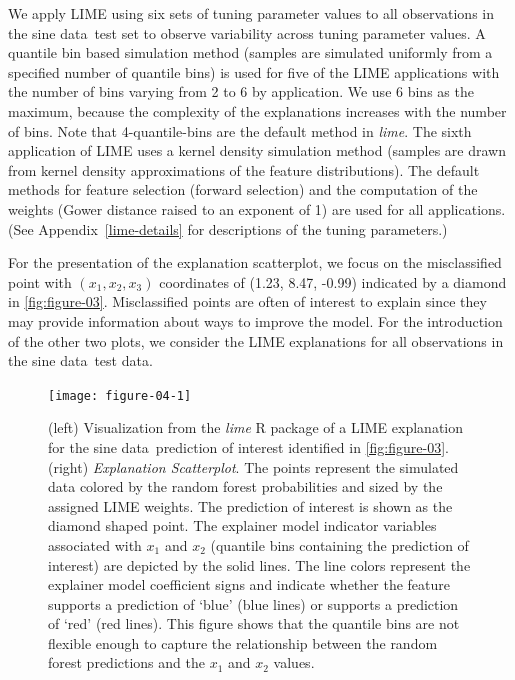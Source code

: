 \documentclass[AMS,STIX2COL]{WileyNJD-v2}\usepackage[]{graphicx}\usepackage[]{color}
\newenvironment{knitrout}{}{} %
\newcommand{\data}{sine data}
\begin{document}
We apply LIME using six sets of tuning parameter values to all observations in the \data \ test set to observe variability across tuning parameter values. A quantile bin based simulation method (samples are simulated uniformly from a specified number of quantile bins) is used for five of the LIME applications with the number of bins varying from 2 to 6 by application. We use 6 bins as the maximum, because the complexity of the explanations increases with the number of bins. Note that 4-quantile-bins are the default method in \emph{lime}. The sixth application of LIME uses a kernel density simulation method (samples are drawn from kernel density approximations of the feature distributions). The default methods for feature selection (forward selection) and the computation of the weights (Gower distance raised to an exponent of 1) are used for all applications. (See Appendix~\ref{lime-details} for descriptions of the tuning parameters.)

For the presentation of the explanation scatterplot, we focus on the misclassified point with $(x_1, x_2, x_3)$ coordinates of (1.23, 8.47, -0.99) indicated by a diamond in \autoref{fig:figure-03}. Misclassified points are often of interest to explain since they may provide information about ways to improve the model. For the introduction of the other two  plots, we consider the LIME explanations for  all observations in the \data \ test data.





\begin{figure}[!thp]
\begin{knitrout}
\color{fgcolor}

{\centering \texttt{[image: figure-04-1]} 

}



\end{knitrout}
\caption{(left) Visualization from the \emph{lime} R package of a LIME explanation for the \data \ prediction of interest identified in \autoref{fig:figure-03}. (right) \emph{Explanation Scatterplot}. The points represent the simulated data colored by the random forest probabilities and sized by the assigned LIME weights. The prediction of interest is shown as the diamond shaped point. The explainer model indicator variables associated with $x_1$ and $x_2$ (quantile bins containing the prediction of interest) are depicted by the solid lines. The line colors represent the explainer model coefficient signs and indicate whether the feature supports a prediction of `blue' (blue lines) or supports a prediction of `red' (red lines). This figure shows that the quantile bins are not flexible enough to capture the relationship between the random forest predictions and the $x_1$ and $x_2$ values.}
\label{fig:figure-04}
\end{figure}
\end{document}
